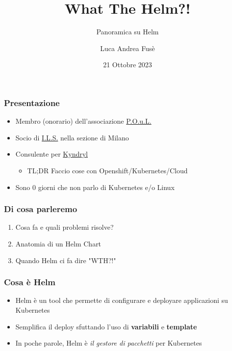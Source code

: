 \documentclass{beamer}
\title{What The Helm?!}
\subtitle{Panoramica su Helm}
\author{Luca Andrea Fusè}
\date{21 Ottobre 2023}
\begin{document}
\renewcommand{\CancelColor}{\color{red}}

\begin{frame}
    \titlepage
\end{frame}
 
 \begin{frame}
     \frametitle{Presentazione}

    \begin{itemize}
        \item Membro (onorario) dell'associazione \href{https://www.poul.org}{P.O.u.L.}
        \item Socio di \href{https://www.ils.org}{I.L.S.} nella sezione di Milano
        \item Consulente per \href{https://www.kyndryl.com}{Kyndryl}
        \begin{itemize}\item TL;DR Faccio cose con Openshift/Kubernetes/Cloud \end{itemize}
        \item Sono 0 giorni che non parlo di Kubernetes e/o Linux
    \end{itemize}
 \end{frame}
 
 \begin{frame}
   \frametitle{Di cosa parleremo}
   \begin{enumerate}
    \item Cosa fa e quali problemi risolve?
    \item Anatomia di un Helm Chart
    \item Quando Helm ci fa dire "WTH?!"
   
   \end{enumerate}
  \end{frame}

\begin{frame}
\frametitle{Cosa è Helm}
 \begin{itemize}
    \item Helm è un tool che permette di configurare e deployare applicazioni su Kubernetes
    \item Semplifica il deploy sfuttando l'uso di \textbf{variabili} e \textbf{template}
    \item In poche parole, Helm è \textit{il gestore di pacchetti} per Kubernetes
  \end{itemize}
\end{frame}

 \begin{frame}
     
 \end{frame}
\end{document}
